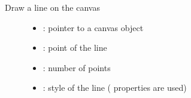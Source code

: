 \documentclass[letterpaper,10pt,english]{sphinxmanual}
\begin{document}
\begin{fulllineitems}
\label{\detokenize{object-types/canvas:_CPPv419lv_canvas_draw_lineP8lv_obj_tPK10lv_point_t8uint32_tPK10lv_style_t}}%
\pysigstartmultiline
{}\label{\detokenize{object-types/canvas:lv__canvas_8h_1aa835bb326d24daa91a273f2197e150ce}}%
\pysigstopmultiline
Draw a line on the canvas \begin{description}
\item[{}] \leavevmode\begin{itemize}
\item {} 
: pointer to a canvas object 

\item {} 
: point of the line 

\item {} 
: number of points 

\item {} 
: style of the line ( properties are used) 

\end{itemize}

\end{description}


\end{fulllineitems}

\end{document}
